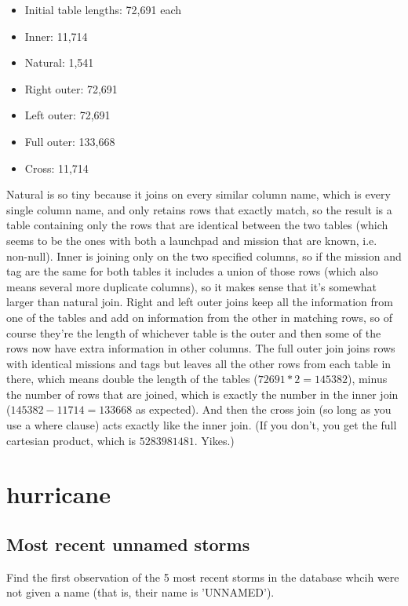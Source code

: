 \documentclass[11pt, oneside]{amsart}   	%
\begin{document}
\begin{itemize}
    \item Initial table lengths: 72,691 each
    \item Inner: 11,714
    \item Natural: 1,541
    \item Right outer: 72,691
    \item Left outer: 72,691
    \item Full outer: 133,668
    \item Cross: 11,714
\end{itemize}

Natural is so tiny because it joins on every similar column name, which is every single column name, and only retains rows that exactly match, so the result is a table containing only the rows that are identical between the two tables (which seems to be the ones with both a launchpad and mission that are known, i.e. non-null). Inner is joining only on the two specified columns, so if the mission and tag are the same for both tables it includes a union of those rows (which also means several more duplicate columns), so it makes sense that it's somewhat larger than natural join. Right and left outer joins keep all the information from one of the tables and add on information from the other in matching rows, so of course they're the length of whichever table is the outer and then some of the rows now have extra information in other columns. The full outer join joins rows with identical missions and tags but leaves all the other rows from each table in there, which means double the length of the tables ($72691 * 2 = 145382$), minus the number of rows that are joined, which is exactly the number in the inner join ($145382 - 11714 = 133668$ as expected). And then the cross join (so long as you use a where clause) acts exactly like the inner join. (If you don't, you get the full cartesian product, which is $5283981481$. Yikes.)

\section{hurricane}

\subsection{Most recent unnamed storms} Find the first observation of the 5 most recent storms in the database whcih were not given a name (that is, their name is 'UNNAMED').
\end{document}
